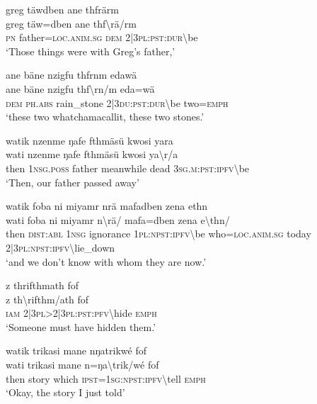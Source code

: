 \ea\label{ex:1:a3858}
greg täwdben ane thfrärm\\
\gll greg	täw=dben	ane	thf{\textbackslash}rä/rm\\
     \textsc{pn}	father=\textsc{loc}.\textsc{anim}.\textsc{sg}	\textsc{dem}	2|3\textsc{pl}:\textsc{pst}:\textsc{dur}{\textbackslash}be\\
\glt `Those things were with Greg's father,'
\z

\ea\label{ex:1:a3859}
ane bäne nzigfu thfrnm edawä\\
\gll ane	bäne	nzigfu	thf{\textbackslash}rn/m	eda=wä\\
     \textsc{dem}	\textsc{ph}.\textsc{abs}	rain\_stone	2|3\textsc{du}:\textsc{pst}:\textsc{dur}{\textbackslash}be	two=\textsc{emph}\\
\glt `these two whatchamacallit, these two stones.'
\z

\ea\label{ex:1:a3861}
watik nzenme ŋafe fthmäsü kwosi yara\\
\gll wati	nzenme	ŋafe	fthmäsü	kwosi	ya{\textbackslash}r/a\\
     then	1\textsc{nsg}.\textsc{poss}	father	meanwhile	dead	3\textsc{sg}.\textsc{m}:\textsc{pst}:\textsc{ipfv}{\textbackslash}be\\
\glt `Then, our father passed away'
\z

\ea\label{ex:1:a3863}
watik foba ni miyamr nrä mafadben zena ethn\\
\gll wati	foba	ni	miyamr	n{\textbackslash}rä/	mafa=dben	zena	e{\textbackslash}thn/\\
     then	\textsc{dist}:\textsc{abl}	1\textsc{nsg}	ignorance	1\textsc{pl}:\textsc{npst}:\textsc{ipfv}{\textbackslash}be	who=\textsc{loc}.\textsc{anim}.\textsc{sg}	today	2|3\textsc{pl}:\textsc{npst}:\textsc{ipfv}{\textbackslash}lie\_down\\
\glt `and we don't know with whom they are now.'
\z

\ea\label{ex:1:a3864}
z thrifthmath fof\\
\gll z	th{\textbackslash}rifthm/ath	fof\\
     \textsc{iam}	2|3\textsc{pl}>2|3\textsc{pl}:\textsc{pst}:\textsc{pfv}{\textbackslash}hide	\textsc{emph}\\
\glt `Someone must have hidden them.'
\z

\ea\label{ex:1:a3865}
watik trikasi mane nŋatrikwé fof\\
\gll wati	trikasi	mane	n=ŋa{\textbackslash}trik/wé	fof\\
     then	story	which	\textsc{ipst}=1\textsc{sg}:\textsc{npst}:\textsc{ipfv}{\textbackslash}tell	\textsc{emph}\\
\glt `Okay, the story I just told'
\z

